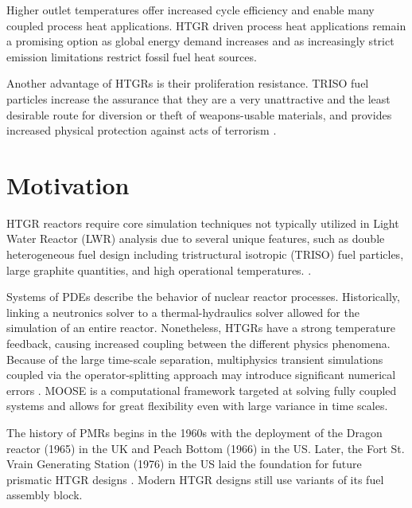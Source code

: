 \documentclass[11pt,letterpaper]{article}
\begin{document}
Higher outlet temperatures offer increased cycle efficiency and enable many coupled process heat applications.
HTGR driven process heat applications remain a promising option as global energy demand increases and as increasingly strict emission limitations restrict fossil fuel heat sources\cite{huning_steady_2014}.


Another advantage of \glspl{HTGR} is their proliferation resistance.
\gls{TRISO} fuel particles increase the assurance that they are a very unattractive and the least desirable route for diversion or theft of weapons-usable materials, and provides increased physical protection against acts of terrorism \cite{huning_steady_2014}.


\section{Motivation}

HTGR reactors require core simulation techniques not typically utilized in Light Water Reactor (LWR) analysis due to several unique features, such as double heterogeneous fuel design including tristructural isotropic (TRISO) fuel particles, large graphite quantities, and high operational temperatures.
\cite{bostelmann_criticality_2016}.


Systems of \glspl{PDE} describe the behavior of nuclear reactor processes.
Historically, linking a neutronics solver to a thermal-hydraulics solver allowed for the simulation of an entire reactor.
Nonetheless, \glspl{HTGR} have a strong temperature feedback, causing increased coupling between the different physics phenomena.
Because of the large time-scale separation, multiphysics transient simulations coupled via the operator-splitting approach may introduce significant numerical errors \cite{ragusa_consistent_2009} \cite{park_tightly_2010}.
\gls{MOOSE} \cite{gaston_moose_2009} is a computational framework targeted at solving fully coupled systems and allows for great flexibility even with large variance in time scales.


The history of \glspl{PMR} begins in the 1960s with the deployment of the Dragon reactor (1965) in the \gls{UK} and Peach Bottom (1966) in the \gls{US}.
Later, the Fort St. Vrain Generating Station (1976) in the \gls{US} laid the foundation for future prismatic \gls{HTGR} designs \cite{aris_iaea_general_2013}.
Modern \gls{HTGR} designs still use variants of its fuel assembly block.
\end{document}
